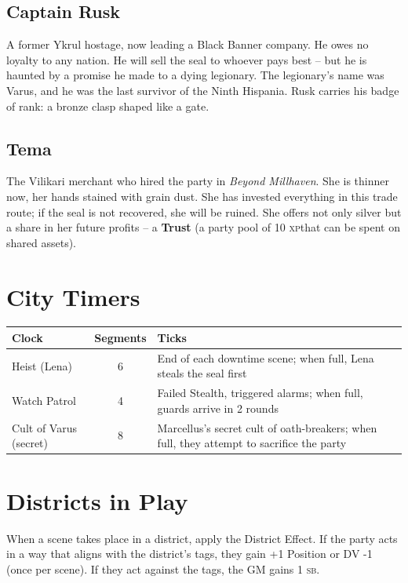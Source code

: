 \documentclass[10pt,twoside]{book}
\newcommand{\sb}{\textsc{sb}}
\newcommand{\xp}{\textsc{xp}}
\begin{document}
\subsection{Captain Rusk}
A former Ykrul hostage, now leading a Black Banner company. He owes no loyalty to any nation. He will sell the seal to whoever pays best -- but he is haunted by a promise he made to a dying legionary. The legionary's name was Varus, and he was the last survivor of the Ninth Hispania. Rusk carries his badge of rank: a bronze clasp shaped like a gate.

\subsection{Tema}
The Vilikari merchant who hired the party in \textit{Beyond Millhaven}. She is thinner now, her hands stained with grain dust. She has invested everything in this trade route; if the seal is not recovered, she will be ruined. She offers not only silver but a share in her future profits -- a \textbf{Trust} (a party pool of 10 \xp that can be spent on shared assets).

\section{City Timers}

\begin{longtable}{p{4cm} c p{5cm}}
\toprule
\textbf{Clock} & \textbf{Segments} & \textbf{Ticks} \\
\midrule
Heist (Lena) & 6 & End of each downtime scene; when full, Lena steals the seal first \\
Watch Patrol & 4 & Failed Stealth, triggered alarms; when full, guards arrive in 2 rounds \\
Cult of Varus (secret) & 8 & Marcellus's secret cult of oath-breakers; when full, they attempt to sacrifice the party \\
\bottomrule
\end{longtable}

\section{Districts in Play}

When a scene takes place in a district, apply the District Effect. If the party acts in a way that aligns with the district's tags, they gain +1 Position or DV -1 (once per scene). If they act against the tags, the GM gains 1 \sb.
\end{document}
